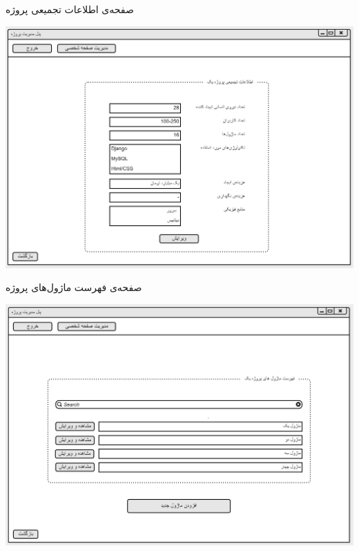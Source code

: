 \vspace{1cm}
صفحه‌ی اطلاعات تجمیعی پروژه
\begin{center}
\includegraphics[width=\textwidth]{Prototype/ProjectManager/ProjectInformation.png}
\end{center}

\newpage
\vspace{1cm}
صفحه‌ی فهرست ماژول‌های پروژه
\begin{center}
\includegraphics[width=\textwidth]{Prototype/ProjectManager/ProjectModulesList.png}
\end{center}

